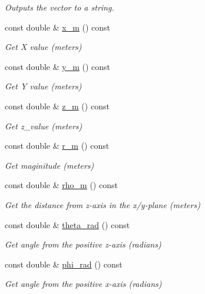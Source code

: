\begin{DoxyCompactItemize}
\begin{DoxyCompactList}\small\item\em Outputs the vector to a string. \end{DoxyCompactList}\item 
const double \& \hyperlink{classosse_1_1collaborate_1_1_vector_a27f502b21a0315ed49c9930e62594315}{x\+\_\+m} () const
\begin{DoxyCompactList}\small\item\em Get X value (meters) \end{DoxyCompactList}\item 
const double \& \hyperlink{classosse_1_1collaborate_1_1_vector_ad48f3746794d4119158f09a8876a3a7b}{y\+\_\+m} () const
\begin{DoxyCompactList}\small\item\em Get Y value (meters) \end{DoxyCompactList}\item 
const double \& \hyperlink{classosse_1_1collaborate_1_1_vector_a149cc9058ce5610a15252a7710a13c81}{z\+\_\+m} () const
\begin{DoxyCompactList}\small\item\em Get z\+\_\+value (meters) \end{DoxyCompactList}\item 
const double \& \hyperlink{classosse_1_1collaborate_1_1_vector_a43ab316f8ed0dce4dc6006c80ea97987}{r\+\_\+m} () const
\begin{DoxyCompactList}\small\item\em Get maginitude (meters) \end{DoxyCompactList}\item 
const double \& \hyperlink{classosse_1_1collaborate_1_1_vector_a61bc6a4b1074ca5d69e8eb581128b6a0}{rho\+\_\+m} () const
\begin{DoxyCompactList}\small\item\em Get the distance from z-\/axis in the x/y-\/plane (meters) \end{DoxyCompactList}\item 
const double \& \hyperlink{classosse_1_1collaborate_1_1_vector_aa74ca108111d3b520f5e39407d3c4c0a}{theta\+\_\+rad} () const
\begin{DoxyCompactList}\small\item\em Get angle from the positive z-\/axis (radians) \end{DoxyCompactList}\item 
const double \& \hyperlink{classosse_1_1collaborate_1_1_vector_a616314b8bb82923b6bc689bd8af88552}{phi\+\_\+rad} () const
\begin{DoxyCompactList}\small\item\em Get angle from the positive x-\/axis (radians) \end{DoxyCompactList}\end{DoxyCompactItemize}
